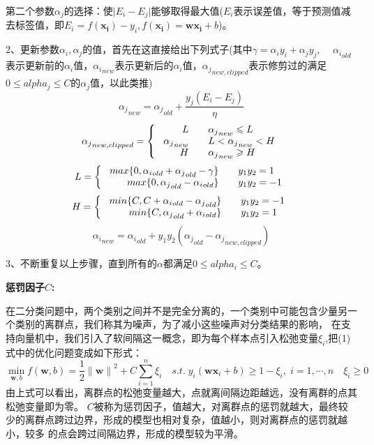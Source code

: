 \documentclass[UTF8]{ctexart}
\begin{document}
第二个参数$\alpha_j$的选择：使$\vert E_i-E_j \vert$能够取得最大值($E_i$表示误差值，等于预测值减去标签值，即$E_i=f(\boldsymbol{x_i}) - y_i,f(\boldsymbol{x_i})=\boldsymbol w \boldsymbol{x_i} + b$)。

2、更新参数$\alpha_i,\alpha_j$的值，首先在这直接给出下列式子(其中$\gamma=\alpha_i y_i + \alpha_j y_j$,$\quad$ ${\alpha_i}_{old}$表示更新前的$\alpha_i$值，${\alpha_i}_{new}$表示更新后的$\alpha_i$值，${\alpha_j}_{new,clipped}$表示修剪过的满足$0 \leqslant alpha_j \leqslant C$的$\alpha_j$值，以此类推)
$${\alpha_j}_{new} = {\alpha_j}_{old} + \frac{y_j(E_i-E_j)}{\eta}$$
\begin{equation}\notag
    {\alpha_j}_{new,clipped}=\left\{\
    \begin{array}{rcl}
        L && {{\alpha_j}_{new} \leqslant L} \\
        {\alpha_j}_{new} && {L<{\alpha_j}_{new} < H} \\
        H && {{\alpha_j}_{new} \geqslant H}
    \end{array}\right.
\end{equation}
\begin{equation}\notag
    L=\left\{\
    \begin{array}{rcl}
        max\{0,{\alpha_i}_{old}+{\alpha_j}_{old} - \gamma\} && {y_1y_2=1} \\
        max\{0,{\alpha_j}_{old} - {\alpha_i}_{old} \} && {y_1y_2=-1}
    \end{array}\right.
\end{equation}
\begin{equation}\notag
    H=\left\{\
    \begin{array}{rcl}
        min\{C,C+{\alpha_i}_{old} - {\alpha_j}_{old}\} && {y_1y_2=-1} \\
        min\{C,{\alpha_j}_{old} + {\alpha_i}_{old} \} && {y_1y_2=1}
    \end{array}\right.
\end{equation}
$${\alpha_i}_{new}={\alpha_i}_{old} + y_1y_2({\alpha_j}_{old}-{\alpha_j}_{new,clipped})$$

3、不断重复以上步骤，直到所有的$\alpha$都满足$0 \leqslant alpha_i \leqslant C$。

\noindent \large \textbf{惩罚因子$C$:}

在二分类问题中，两个类别之间并不是完全分离的，一个类别中可能包含少量另一个类别的离群点，我们称其为噪声，为了减小这些噪声对分类结果的影响，
在支持向量机中，我们引入了软间隔这一概念，即为每个样本点引入松弛变量$\xi_i$,把(1)式中的优化问题变成如下形式：
\begin{equation} 
    \min_{\boldsymbol w,b} f(\boldsymbol w,b)=\frac{1}{2} {\| \boldsymbol w\|}^2 + C \sum_{i=1}^n \xi_i\quad s.t.\; y_i( \boldsymbol w \boldsymbol x_i+b) \geqslant 1-\xi_i,\; i=1,\cdots ,n \quad \xi_i\geqslant 0
\end{equation}
由上式可以看出，离群点的松弛变量越大，点就离间隔边距越远，没有离群的点其松弛变量即为零。
$C$被称为惩罚因子，值越大，对离群点的惩罚就越大，最终较少的离群点跨过边界，形成的模型也相对复杂，值越小，则对离群点的惩罚就越小，较多
的点会跨过间隔边界，形成的模型较为平滑。
\end{document}
